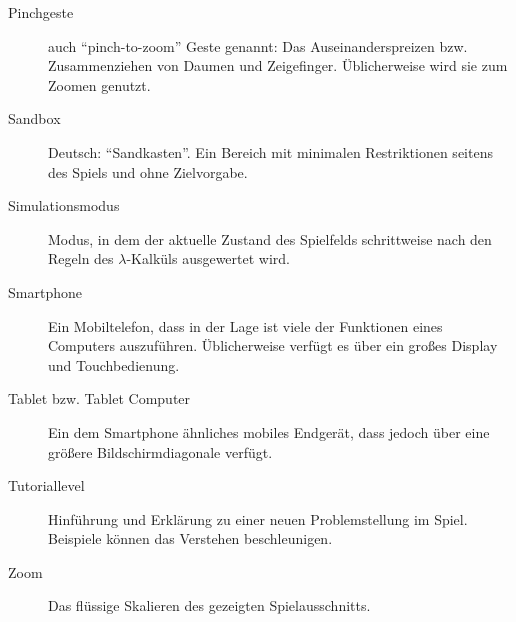 \begin{description}
	\item [Pinchgeste]auch "`pinch-to-zoom"' Geste genannt: Das Auseinanderspreizen bzw. Zusammenziehen von Daumen und Zeigefinger. Üblicherweise wird sie zum Zoomen genutzt.
	\item [Sandbox] Deutsch: "`Sandkasten"'. Ein Bereich mit minimalen Restriktionen seitens des Spiels und ohne Zielvorgabe.
	\item[Simulationsmodus] Modus, in dem der aktuelle Zustand des Spielfelds schrittweise nach den Regeln des \(\lambda\)-Kalküls ausgewertet wird.
	\item[Smartphone] Ein Mobiltelefon, dass in der Lage ist viele der Funktionen eines Computers auszuführen. Üblicherweise verfügt es über ein großes Display und Touchbedienung.
	\item[Tablet bzw. Tablet Computer] Ein dem Smartphone ähnliches mobiles Endgerät, dass jedoch über eine größere Bildschirmdiagonale verfügt.
	\item[Tutoriallevel] Hinführung und Erklärung zu einer neuen Problemstellung im Spiel. Beispiele können das Verstehen beschleunigen.
	\item[Zoom] Das flüssige Skalieren des gezeigten Spielausschnitts.
\end{description}

